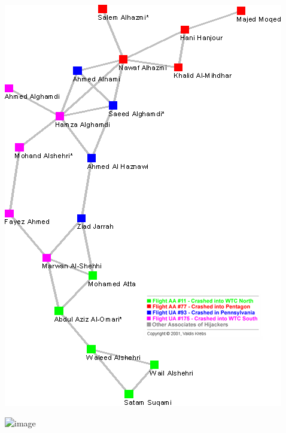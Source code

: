 \documentclass{beamer}
\def\vf{\vfill}
\begin{document}
\begin{frame}

\begin{center}
\includegraphics[height=0.90\textheight]{figures/krebs_uncloaking_2002_fig2}
\end{center}

\vf
{}

\end{frame}
\begin{frame}

\begin{center}
\includegraphics<1>[width=0.95\textwidth]{figures/madoff}
\end{center}

\vf
{}

\end{frame}
\end{document}
